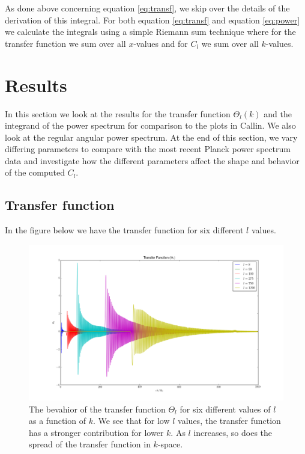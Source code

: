 \documentclass[a4paper]{article}
\begin{document}
As done above concerning equation \ref{eq:transf}, we skip over the details of the derivation of this integral. For both equation \ref{eq:transf} and equation \ref{eq:power} we calculate the integrals using a simple Riemann sum technique where for the transfer function we sum over all $x$-values and for $C_l$ we sum over all $k$-values.

\section{Results}

In this section we look at the results for the transfer function $\Theta_l(k)$ and the integrand of the power spectrum for comparison to the plots in Callin. We also look at the regular angular power spectrum. At the end of this section, we vary differing parameters to compare with the most recent Planck power spectrum data and investigate how the different parameters affect the shape and behavior of the computed $C_l$.

\subsection{Transfer function}

In the figure below we have the transfer function for six different $l$ values.

\begin{figure}[ht]\label{fig:trans}
\centering
\includegraphics[width=\linewidth]{transfer_function_simulated}
\caption{The bevahior of the transfer function $\Theta_l$ for six different values of $l$ as a function of $k$. We see that for low $l$ values, the transfer function has a stronger contribution for lower $k$. As $l$ increases, so does the spread of the transfer function in $k$-space.}
\end{figure}
\end{document}
